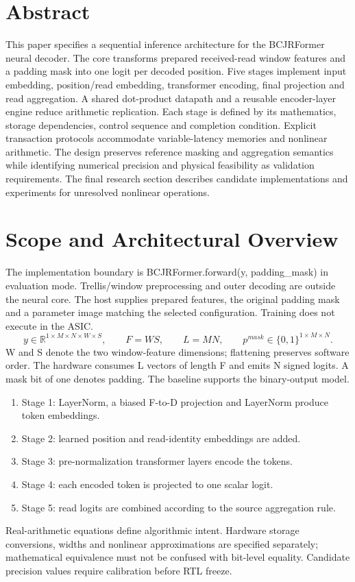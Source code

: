 \section{Abstract}
This paper specifies a sequential inference architecture for the BCJRFormer neural decoder. The core transforms prepared received-read window features and a padding mask into one logit per decoded position. Five stages implement input embedding, position/read embedding, transformer encoding, final projection and read aggregation. A shared dot-product datapath and a reusable encoder-layer engine reduce arithmetic replication. Each stage is defined by its mathematics, storage dependencies, control sequence and completion condition. Explicit transaction protocols accommodate variable-latency memories and nonlinear arithmetic. The design preserves reference masking and aggregation semantics while identifying numerical precision and physical feasibility as validation requirements. The final research section describes candidate implementations and experiments for unresolved nonlinear operations.

\section{Scope and Architectural Overview}
The implementation boundary is BCJRFormer.forward(y, padding\_mask) in evaluation mode. Trellis/window preprocessing and outer decoding are outside the neural core. The host supplies prepared features, the original padding mask and a parameter image matching the selected configuration. Training does not execute in the ASIC.
\[
y\in\mathbb{R}^{1\times M\times N\times W\times S},\qquad
F=WS,\qquad L=MN,\qquad
p^{mask}\in\{0,1\}^{1\times M\times N}.
\]
W and S denote the two window-feature dimensions; flattening preserves software order. The hardware consumes L vectors of length F and emits N signed logits. A mask bit of one denotes padding. The baseline supports the binary-output model.
\begin{enumerate}
\item Stage 1: LayerNorm, a biased F-to-D projection and LayerNorm produce token embeddings.
\item Stage 2: learned position and read-identity embeddings are added.
\item Stage 3: pre-normalization transformer layers encode the tokens.
\item Stage 4: each encoded token is projected to one scalar logit.
\item Stage 5: read logits are combined according to the source aggregation rule.
\end{enumerate}
Real-arithmetic equations define algorithmic intent. Hardware storage conversions, widths and nonlinear approximations are specified separately; mathematical equivalence must not be confused with bit-level equality. Candidate precision values require calibration before RTL freeze.
